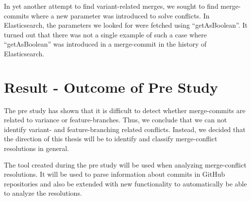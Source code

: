 In yet another attempt to find variant-related merges, we sought to find merge-commits where a new parameter was introduced to solve conflicts. In Elasticsearch, the parameters we looked for were fetched using “getAsBoolean”. It turned out that there was not a single example of such a case where “getAsBoolean” was introduced in a merge-commit in the history of Elasticsearch.

\section{Result - Outcome of Pre Study}
The pre study has shown that it is difficult to detect whether merge-commits are related to variance or feature-branches. Thus, we conclude that we can not identify variant- and feature-branching related conflicts. Instead, we decided that the direction of this thesis will be to identify and classify merge-conflict resolutions in general.

The tool created during the pre study will be used when analyzing merge-conflict resolutions. It will be used to parse information about commits in GitHub repositories and also be extended with new functionality to automatically be able to analyze the resolutions.




